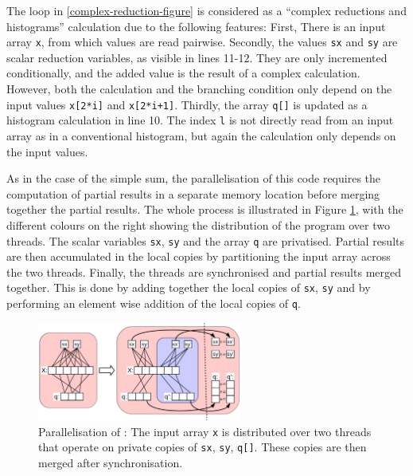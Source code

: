     The loop in \ref{complex-reduction-figure} is considered as a
    ``complex reductions and histograms'' calculation due to the following
    features:
    First, There is an input array \texttt{x}, from which values are read
    pairwise.
    Secondly, the values \texttt{sx} and \texttt{sy} are scalar reduction
    variables, as visible in lines 11-12.
    They are only incremented conditionally, and the added value is the result
    of a complex calculation.
    However, both the calculation and the branching condition only depend on the
    input values \texttt{x[2*i]} and \texttt{x[2*i+1]}.
    Thirdly, the array \texttt{q[]} is updated as a histogram calculation in
    line 10.
    The index \texttt{l} is not directly read from an input array as in a
    conventional histogram, but again the calculation only depends on the input
    values.

    As in the case of the simple sum, the parallelisation of this code
    requires the computation of partial results in a separate memory
    location before merging together the partial results.
    The whole process is illustrated in Figure \ref{nice-picture}, with the
    different colours on the right showing the distribution of the program
    over two threads.
    The scalar variables \texttt{sx}, \texttt{sy} and the array \texttt{q} are
    privatised.
    Partial results are then accumulated in the local copies by partitioning the
    input array across the two threads. 
    Finally, the threads are synchronised and partial results merged together.
    This is done by adding together the local copies of \texttt{sx}, \texttt{sy}
    and by performing an element wise addition of the local copies of
    \texttt{q}. 

\begin{figure}[t]
\centering
\includegraphics[width=0.6\textwidth]{figures/nicepicture.png}
\caption{Parallelisation of :
         The input array \texttt{x} is distributed over two threads that operate
         on private copies of \texttt{sx}, \texttt{sy}, \texttt{q[]}.
         These copies are then merged after synchronisation.\parfillskip=0pt}
\label{nice-picture}
\end{figure}


